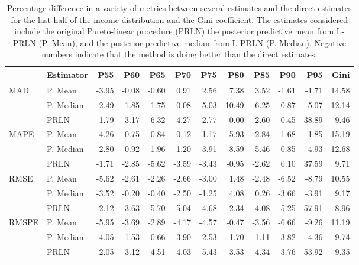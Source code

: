 \documentclass[12pt]{article}
\begin{document}
\begin{table}[ht]
  \centering
  {\footnotesize
    \begin{tabular}{llrrrrrrrrrr}
      \hline
      & Estimator & P55 & P60 & P65 & P70 & P75 & P80 & P85 & P90 & P95 & Gini \\
      \hline
      MAD & P. Mean & -3.95 & -0.08 & -0.60 & 0.91 & 2.56 & 7.38 & 3.52 & -1.61 & -1.71 & 14.58 \\
      & P. Median & -2.49 & 1.85 & 1.75 & -0.08 & 5.03 & 10.49 & 6.25 & 0.87 & 5.07 & 12.14 \\
      & PRLN & -1.79 & -3.17 & -6.32 & -4.27 & -2.77 & -0.00 & -2.60 & 0.45 & 38.89 & 9.46 \\ \hline
      MAPE & P. Mean & -4.26 & -0.75 & -0.84 & -0.12 & 1.17 & 5.93 & 2.84 & -1.68 & -1.85 & 15.19 \\
      & P. Median & -2.80 & 0.92 & 1.96 & -1.20 & 3.91 & 8.59 & 5.46 & 0.85 & 4.93 & 12.68 \\
      & PRLN & -1.71 & -2.85 & -5.62 & -3.59 & -3.43 & -0.95 & -2.62 & 0.10 & 37.59 & 9.71 \\ \hline
      RMSE & P. Mean & -5.62 & -2.61 & -2.26 & -2.66 & -3.00 & 1.48 & -2.48 & -6.52 & -8.79 & 10.55 \\
      & P. Median & -3.52 & -0.20 & -0.40 & -2.50 & -1.25 & 4.08 & 0.26 & -3.66 & -3.91 & 9.17 \\
      & PRLN & -2.12 & -3.63 & -5.70 & -5.04 & -4.68 & -2.34 & -4.08 & 5.25 & 57.91 & 8.96 \\ \hline
      RMSPE & P. Mean & -5.95 & -3.69 & -2.89 & -4.17 & -4.57 & -0.47 & -3.56 & -6.66 & -9.26 & 11.19 \\
      & P. Median & -4.05 & -1.53 & -0.66 & -3.90 & -2.53 & 1.70 & -1.11 & -3.82 & -4.36 & 9.74 \\
      & PRLN & -2.05 & -3.12 & -4.51 & -4.03 & -5.43 & -3.53 & -4.34 & 3.76 & 53.92 & 9.35 \\
      \hline
    \end{tabular}
  }
\caption{Percentage difference in a variety of metrics between several estimates and the direct estimates for the last half of the income distribution and the Gini coefficient. The estimates considered include the original Pareto-linear procedure (PRLN) the posterior predictive mean from L-PRLN (P. Mean), and the posterior predictive median from L-PRLN (P. Median). Negative numbers indicate that the method is doing better than the direct estimates.}
\label{tab:sim2}
\end{table}
\end{document}
